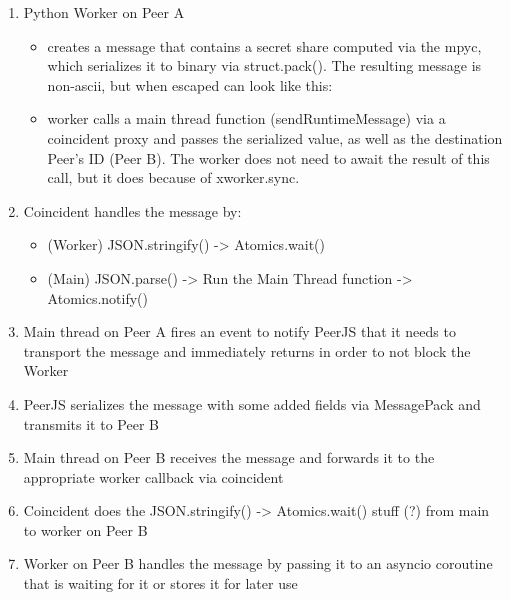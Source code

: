 \begin{enumerate}
\def\labelenumi{\arabic{enumi}.}
\item
  Python Worker on Peer A

  \begin{itemize}
  \tightlist
  \item
    creates a message that contains a secret share computed via the mpyc, which serializes it to binary via struct.pack(). The resulting message is non-ascii, but when escaped can look like this:
  \end{itemize}

\begin{Shaded}
\begin{Highlighting}[]
\StringTok{\textquotesingle{}}
\end{Highlighting}
\end{Shaded}

  \begin{itemize}
  \tightlist
  \item
    worker calls a main thread function (sendRuntimeMessage) via a coincident proxy and passes the serialized value, as well as the destination Peer's ID (Peer B). The worker does not need to await the result of this call, but it does because of xworker.sync.
  \end{itemize}
\item
  Coincident handles the message by:

  \begin{itemize}
  \tightlist
  \item
    (Worker) JSON.stringify() -\textgreater{} Atomics.wait()
  \item
    (Main) JSON.parse() -\textgreater{} Run the Main Thread function -\textgreater{} Atomics.notify()
  \end{itemize}
\item
  Main thread on Peer A fires an event to notify PeerJS that it needs to transport the message and immediately returns in order to not block the Worker
\item
  PeerJS serializes the message with some added fields via MessagePack and transmits it to Peer B
\item
  Main thread on Peer B receives the message and forwards it to the appropriate worker callback via coincident
\item
  Coincident does the JSON.stringify() -\textgreater{} Atomics.wait() stuff (?) from main to worker on Peer B
\item
  Worker on Peer B handles the message by passing it to an asyncio coroutine that is waiting for it or stores it for later use
\end{enumerate}

